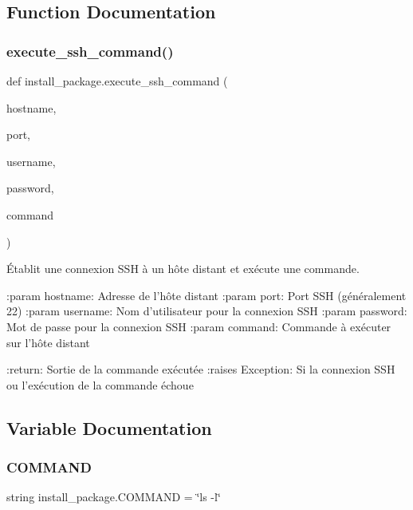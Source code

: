\subsection{Function Documentation}
\mbox{\label{namespaceinstall__package_a42a6d7d8adb7f681d019e52307b723c8}} 
\subsubsection{\texorpdfstring{execute\+\_\+ssh\+\_\+command()}{execute\_ssh\_command()}}
{\footnotesize\ttfamily def install\+\_\+package.\+execute\+\_\+ssh\+\_\+command (\begin{DoxyParamCaption}\item[{}]{hostname,  }\item[{}]{port,  }\item[{}]{username,  }\item[{}]{password,  }\item[{}]{command }\end{DoxyParamCaption})}

\begin{DoxyVerb}Établit une connexion SSH à un hôte distant et exécute une commande.

:param hostname: Adresse de l'hôte distant
:param port: Port SSH (généralement 22)
:param username: Nom d'utilisateur pour la connexion SSH
:param password: Mot de passe pour la connexion SSH
:param command: Commande à exécuter sur l'hôte distant

:return: Sortie de la commande exécutée
:raises Exception: Si la connexion SSH ou l'exécution de la commande échoue
\end{DoxyVerb}
 

\subsection{Variable Documentation}
\mbox{\label{namespaceinstall__package_a4c23108a299350f164877e17265d5966}} 
\subsubsection{\texorpdfstring{C\+O\+M\+M\+A\+ND}{COMMAND}}
{\footnotesize\ttfamily string install\+\_\+package.\+C\+O\+M\+M\+A\+ND = \char`\"{}ls -\/l\char`\"{}}

